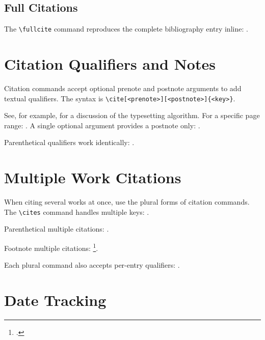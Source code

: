 \documentclass[
    language=english,
    doctype=article,
    institution=none,
]{../../omnilatex}
\begin{document}
\subsection{Full Citations}

The \verb|\fullcite| command reproduces the complete bibliography entry
inline: .

\section{Citation Qualifiers and Notes}
\label{sec:qualifiers}

Citation commands accept optional prenote and postnote arguments to add
textual qualifiers.  The syntax is
\verb|\cite[<prenote>][<postnote>]{<key>}|.

See, for example, \cite[see][p.~42]{knuthTeXbook1986} for a discussion of
the typesetting algorithm.  For a specific page range:
\cite[pp.~891--921]{einstein1905}.  A single optional argument provides a
postnote only: \cite[p.~144]{PTBSI}.

Parenthetical qualifiers work identically:
\parencite[for an overview][Chapter~3]{goossensLaTeXCompanion1993}.

\section{Multiple Work Citations}
\label{sec:multiple}

When citing several works at once, use the plural forms of citation
commands.  The \verb|\cites| command handles multiple keys:
\cites{einstein1905}{knuthTeXbook1986}{goossensLaTeXCompanion1993}.

Parenthetical multiple citations:
\parencites{ramalhoFluentPython2015}{mckinneyPythonDataAnalysis2018}{birdNaturalLanguageProcessing2009}.

Footnote multiple citations:
\footcites{diracPrinciplesQuantumMechanics1981}{baehrThermodynamikGrundlagenUnd2016}.

Each plural command also accepts per-entry qualifiers:
\cites[see][p.~5]{einstein1905}[and][p.~100]{knuthTeXbook1986}.

\section{Date Tracking}
\label{sec:date-tracking}
\end{document}
